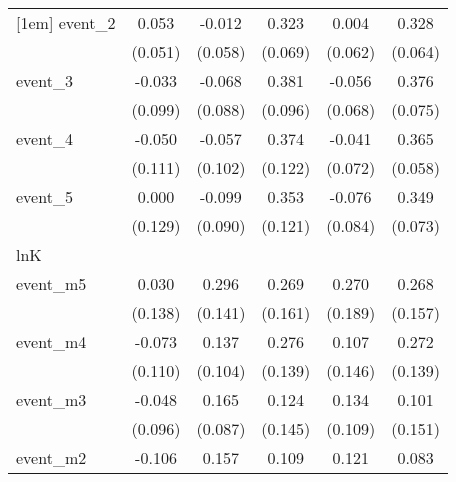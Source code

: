 {\begin{tabular}{l*{5}{c}}
[1em]
event\_2     &       0.053         &      -0.012         &       0.323\sym{***}&       0.004         &       0.328\sym{***}\\
            &     (0.051)         &     (0.058)         &     (0.069)         &     (0.062)         &     (0.064)         \\
[1em]
event\_3     &      -0.033         &      -0.068         &       0.381\sym{***}&      -0.056         &       0.376\sym{***}\\
            &     (0.099)         &     (0.088)         &     (0.096)         &     (0.068)         &     (0.075)         \\
[1em]
event\_4     &      -0.050         &      -0.057         &       0.374\sym{**} &      -0.041         &       0.365\sym{***}\\
            &     (0.111)         &     (0.102)         &     (0.122)         &     (0.072)         &     (0.058)         \\
[1em]
event\_5     &       0.000         &      -0.099         &       0.353\sym{**} &      -0.076         &       0.349\sym{***}\\
            &     (0.129)         &     (0.090)         &     (0.121)         &     (0.084)         &     (0.073)         \\
\hline
lnK         &                     &                     &                     &                     &                     \\
event\_m5    &       0.030         &       0.296\sym{*}  &       0.269         &       0.270         &       0.268         \\
            &     (0.138)         &     (0.141)         &     (0.161)         &     (0.189)         &     (0.157)         \\
[1em]
event\_m4    &      -0.073         &       0.137         &       0.276\sym{*}  &       0.107         &       0.272         \\
            &     (0.110)         &     (0.104)         &     (0.139)         &     (0.146)         &     (0.139)         \\
[1em]
event\_m3    &      -0.048         &       0.165         &       0.124         &       0.134         &       0.101         \\
            &     (0.096)         &     (0.087)         &     (0.145)         &     (0.109)         &     (0.151)         \\
[1em]
event\_m2    &      -0.106         &       0.157\sym{**} &       0.109         &       0.121         &       0.083         \\

\end{tabular}}
